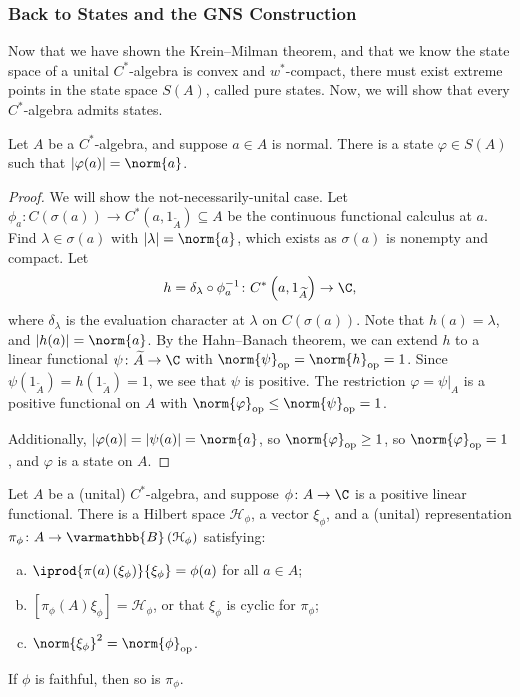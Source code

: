 \documentclass[10pt]{mypackage}
\renewcommand*{\mathbb}[1]{\varmathbb{#1}}
\newcommand{\B}{\mathbb{B}}
\DeclareMathOperator{\op}{op}
\begin{document}
\subsubsection{Back to States and the GNS Construction}%
Now that we have shown the Krein--Milman theorem, and that we know the state space of a unital $C^{\ast}$-algebra is convex and $w^{\ast}$-compact, there must exist extreme points in the state space $S(A)$, called pure states. Now, we will show that every $C^{\ast}$-algebra admits states.
\begin{proposition}
  Let $A$ be a $C^{\ast}$-algebra, and suppose $a\in A$ is normal. There is a state $\varphi\in S(A)$ such that $\left\vert \varphi(a) \right\vert = \norm{a}$.
\end{proposition}
\begin{proof}
  We will show the not-necessarily-unital case. Let $\phi_a\colon C\left(\sigma\left(a\right)\right)\rightarrow C^{\ast}\left(a,1_{\widetilde{A}}\right)\subseteq A$ be the continuous functional calculus at $a$. Find $\lambda\in \sigma(a)$ with $\left\vert \lambda \right\vert = \norm{a}$, which exists as $\sigma(a)$ is nonempty and compact. Let
  \begin{align*}
    h = \delta_{\lambda}\circ \phi_a^{-1}\colon C^{\ast}\left(a,1_{\widetilde{A}}\right) \rightarrow \C,
  \end{align*}
  where $\delta_{\lambda}$ is the evaluation character at $\lambda$ on $C\left(\sigma\left(a\right)\right)$. Note that $h(a) = \lambda$, and $\left\vert h(a) \right\vert = \norm{a}$. By the Hahn--Banach theorem, we can extend $h$ to a linear functional $\psi\colon \widetilde{A}\rightarrow \C$ with $\norm{\psi}_{\op} = \norm{h}_{\op} = 1$. Since $\psi\left(1_{\widetilde{A}}\right) = h\left(1_{\widetilde{A}}\right) = 1$, we see that $\psi$ is positive. The restriction $\varphi = \psi|_{A}$ is a positive functional on $A$ with $\norm{\varphi}_{\op} \leq \norm{\psi}_{\op} = 1$.\newline

  Additionally, $\left\vert \varphi(a) \right\vert = \left\vert \psi(a) \right\vert = \norm{a}$, so $\norm{\varphi}_{\op}\geq 1$, so $\norm{\varphi}_{\op} = 1$, and $\varphi$ is a state on $A$.
\end{proof}
\begin{theorem}
  Let $A$ be a (unital) $C^{\ast}$-algebra, and suppose $\phi\colon A\rightarrow \C$ is a positive linear functional. There is a Hilbert space $\mathcal{H}_{\phi}$, a vector $\xi_{\phi}$, and a (unital) representation $\pi_{\phi}\colon A\rightarrow \B\left(\mathcal{H}_{\phi}\right)$ satisfying:
  \begin{enumerate}[(a)]
    \item $ \iprod{\pi(a)\left(\xi_{\phi}\right)}{\xi_{\phi}} = \phi(a) $ for all $a\in A$;
    \item $\left[\pi_{\phi}(A)\xi_{\phi}\right] = \mathcal{H}_{\phi}$, or that $\xi_{\phi}$ is cyclic for $\pi_{\phi}$;
    \item $\norm{\xi_{\phi}}^2 = \norm{\phi}_{\op}$.
  \end{enumerate}
  If $\phi$ is faithful, then so is $\pi_{\phi}$.
\end{theorem}
\end{document}
